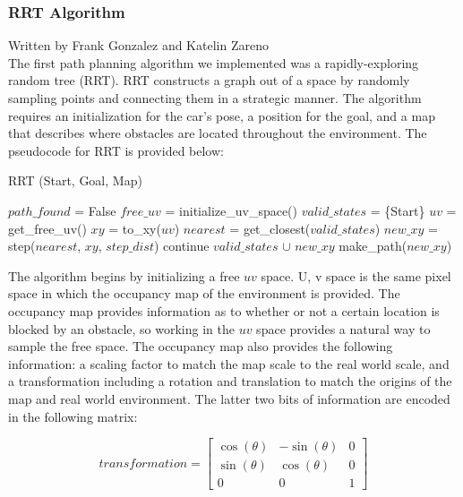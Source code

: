\documentclass{article}
\begin{document}
\subsubsection{RRT Algorithm}
Written by Frank Gonzalez and Katelin Zareno\\

The first path planning algorithm we implemented was a rapidly-exploring random tree (RRT). RRT constructs a graph out of a space by randomly sampling points and connecting them in a strategic manner. The algorithm requires an initialization for the car's pose, a position for the goal, and a map that describes where obstacles are located throughout the environment. The pseudocode for RRT is provided below:
\pagebreak

\begin{algorithm}
\caption{RRT (Start, Goal, Map)}\label{alg:cap}
\begin{algorithmic}[1]
\State $path\_found$ = False
\State $free\_{uv}$ = initialize\_uv\_space()
\State $valid\_states$ = \{Start\}
    \State $uv$ = get\_free\_uv()
    \State $xy$ = to\_xy($uv$)
    \State $nearest$ = get\_closest($valid\_states$)
    \State $new\_xy$ = step($nearest$, $xy$, $step\_dist$)
        continue
    \EndIf
    \State $valid\_states$ $\cup$ $new\_xy$
        make\_path($new\_xy$)
    \EndIf
\EndWhile
\end{algorithmic}
\end{algorithm}

The algorithm begins by initializing a free $uv$ space. U, v space is the same pixel space in which the occupancy map of the environment is provided. The occupancy map provides information as to whether or not a certain location is blocked by an obstacle, so working in the $uv$ space provides a natural way to sample the free space. The occupancy map also provides the following information: a scaling factor to match the map scale to the real world scale, and a transformation including a rotation and translation to match the origins of the map and real world environment. The latter two bits of information are encoded in the following matrix:

\begin{equation}
   transformation = \begin{bmatrix} \cos(\theta) & -\sin(\theta) & 0\\ \sin(\theta) & \cos(\theta) & 0  \\ 0 & 0 & 1\end{bmatrix}
\end{equation}
\end{document}
